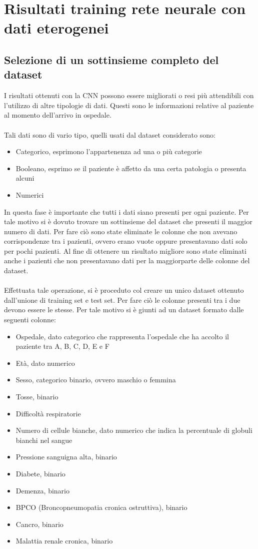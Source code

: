 \chapter{Risultati training rete neurale con dati eterogenei}
\label{ch:MLP}
\section{Selezione di un sottinsieme completo del dataset}
I risultati ottenuti con la CNN possono essere migliorati o resi più attendibili con l'utilizzo
di altre tipologie di dati. Questi sono le informazioni relative al paziente al momento dell'arrivo in 
ospedale.
\\\\
Tali dati sono di vario tipo, quelli usati dal dataset considerato sono: 
\begin{itemize}
    \item Categorico, esprimono l'appartenenza ad una o più categorie
    \item Booleano, esprimo se il paziente è affetto da una certa patologia o presenta alcuni 
    \item Numerici
\end{itemize}
In questa fase è importante che tutti i dati siano presenti per ogni paziente. Per tale motivo si è dovuto 
trovare un sottinsieme del dataset che presenti il maggior numero di dati. 
Per fare ciò sono state eliminate le colonne che non avevano corrispondenze 
tra i pazienti, ovvero erano vuote oppure presentavano dati solo per pochi pazienti.
Al fine di ottenere un risultato migliore sono state eliminati anche i pazienti che non presentavano dati per 
la maggiorparte delle colonne del dataset.
\\\\
Effettuata tale operazione, si è proceduto col creare un unico dataset ottenuto dall'unione 
di training set e test set. Per fare ciò le colonne presenti tra i due devono essere le stesse.
Per tale motivo si è giunti ad un dataset formato dalle seguenti colonne:
\begin{itemize}
    \item Ospedale, dato categorico che rappresenta l'ospedale che ha accolto il paziente tra A, B, C, D, E e F 
    \item Età, dato numerico
    \item Sesso, categorico binario, ovvero maschio o femmina
    \item Tosse, binario
    \item Difficoltà respiratorie
    \item Numero di cellule bianche, dato numerico che indica la percentuale di globuli bianchi nel sangue
    \item Pressione sanguigna alta,  binario
    \item Diabete, binario
    \item Demenza, binario 
    \item BPCO (Broncopneumopatia cronica ostruttiva), binario 
    \item Cancro, binario 
    \item Malattia renale cronica, binario
\end{itemize}
